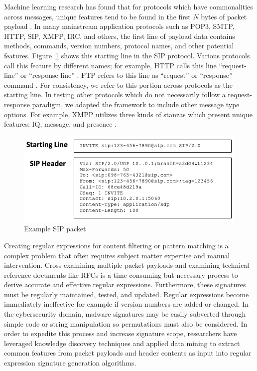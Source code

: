 Machine learning research has found that for protocols which have commonalities across messages, unique features tend to be found in the first $N$ bytes of packet payload \cite{wangxiang}. In many mainstream application protocols such as POP3, SMTP, HTTP, SIP, XMPP, IRC, and others, the first line of payload data contains methods, commands, version numbers, protocol names, and other potential features. Figure~\ref{f:sippacket} shows this starting line in the SIP protocol. Various protocols call this feature by different names; for example, HTTP calls this line ``request-line'' or ``response-line'' \cite{rfc2616}. FTP refers to this line as ``request'' or ``response'' command \cite{rfc959}. For consistency, we refer to this portion across protocols as the starting line. In testing other protocols which do not necessarily follow a request-response paradigm, we adapted the framework to include other message type options. For example, XMPP utilizes three kinds of stanzas which present unique features: IQ, message, and presence \cite{rfc6120}.

\begin{figure}[hbt!]
  \begin{center}
    \includegraphics[width=0.7\columnwidth]{chapters/3/img/SIPpacket.png}
    \caption{Example SIP packet}
    \label{f:sippacket}
  \end{center}
\end{figure}


Creating regular expressions for content filtering or pattern matching  is a complex problem that often requires subject matter expertise and manual intervention. Cross-examining multiple packet payloads and examining technical reference documents like RFCs is a time-consuming but necessary process to derive accurate and effective regular expressions. Furthermore, these signatures must be regularly maintained, tested, and updated. Regular expressions become immediately ineffective for example if version numbers are added or changed. In the cybersecurity domain, malware signatures may be easily subverted through simple code or string manipulation so permutations must also be considered. In order to expedite this process and increase signature scope, researchers have leveraged knowledge discovery techniques and applied data mining to extract common features from packet payloads and header contents as input into regular expression signature generation algorithms.

